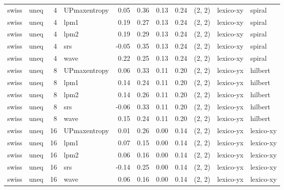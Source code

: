 \begin{tabular}{llrlrrrrlll}
 swiss &  uneq &  4 & UPmaxentropy &  0.05 &     0.36 &   0.13 &       0.24 & (2, 2) &   lexico-xy &     spiral \\
 swiss &  uneq &  4 &         lpm1 &  0.19 &     0.27 &   0.13 &       0.24 & (2, 2) &   lexico-xy &     spiral \\
 swiss &  uneq &  4 &         lpm2 &  0.19 &     0.29 &   0.13 &       0.24 & (2, 2) &   lexico-xy &     spiral \\
 swiss &  uneq &  4 &          srs & -0.05 &     0.35 &   0.13 &       0.24 & (2, 2) &   lexico-xy &     spiral \\
 swiss &  uneq &  4 &         wave &  0.22 &     0.25 &   0.13 &       0.24 & (2, 2) &   lexico-xy &     spiral \\
 swiss &  uneq &  8 & UPmaxentropy &  0.06 &     0.33 &   0.11 &       0.20 & (2, 2) &   lexico-yx &    hilbert \\
 swiss &  uneq &  8 &         lpm1 &  0.14 &     0.24 &   0.11 &       0.20 & (2, 2) &   lexico-yx &    hilbert \\
 swiss &  uneq &  8 &         lpm2 &  0.14 &     0.26 &   0.11 &       0.20 & (2, 2) &   lexico-yx &    hilbert \\
 swiss &  uneq &  8 &          srs & -0.06 &     0.33 &   0.11 &       0.20 & (2, 2) &   lexico-yx &    hilbert \\
 swiss &  uneq &  8 &         wave &  0.15 &     0.24 &   0.11 &       0.20 & (2, 2) &   lexico-yx &    hilbert \\
 swiss &  uneq & 16 & UPmaxentropy &  0.01 &     0.26 &   0.00 &       0.14 & (2, 2) &   lexico-yx &  lexico-xy \\
 swiss &  uneq & 16 &         lpm1 &  0.07 &     0.15 &   0.00 &       0.14 & (2, 2) &   lexico-yx &  lexico-xy \\
 swiss &  uneq & 16 &         lpm2 &  0.06 &     0.16 &   0.00 &       0.14 & (2, 2) &   lexico-yx &  lexico-xy \\
 swiss &  uneq & 16 &          srs & -0.14 &     0.25 &   0.00 &       0.14 & (2, 2) &   lexico-yx &  lexico-xy \\
 swiss &  uneq & 16 &         wave &  0.06 &     0.16 &   0.00 &       0.14 & (2, 2) &   lexico-yx &  lexico-xy \\
\bottomrule
\end{tabular}
